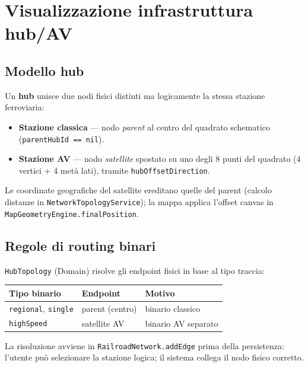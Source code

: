 \chapter{Visualizzazione infrastruttura hub/AV}
\label{ch:infrastructure}

\section{Modello hub}

Un \textbf{hub} unisce due nodi fisici distinti ma logicamente la stessa
stazione ferroviaria:

\begin{itemize}
  \item \textbf{Stazione classica} --- nodo \emph{parent} al centro del
        quadrato schematico (\texttt{parentHubId == nil}).
  \item \textbf{Stazione AV} --- nodo \emph{satellite} spostato su uno
        degli 8 punti del quadrato (4 vertici + 4 metà lati), tramite
        \texttt{hubOffsetDirection}.
\end{itemize}

Le coordinate geografiche del satellite ereditano quelle del parent
(calcolo distanze in \texttt{NetworkTopologyService}); la mappa applica
l'offset canvas in \texttt{MapGeometryEngine.finalPosition}.

\section{Regole di routing binari}

\texttt{HubTopology} (Domain) risolve gli endpoint fisici in base al
tipo traccia:

\begin{center}
\begin{tabular}{lll}
  \toprule
  \textbf{Tipo binario} & \textbf{Endpoint} & \textbf{Motivo} \\
  \midrule
  \texttt{regional}, \texttt{single} & parent (centro) & binario classico \\
  \texttt{highSpeed} & satellite AV & binario AV separato \\
  \bottomrule
\end{tabular}
\end{center}

La risoluzione avviene in \texttt{RailroadNetwork.addEdge} prima della
persistenza: l'utente può selezionare la stazione logica; il sistema
collega il nodo fisico corretto.


